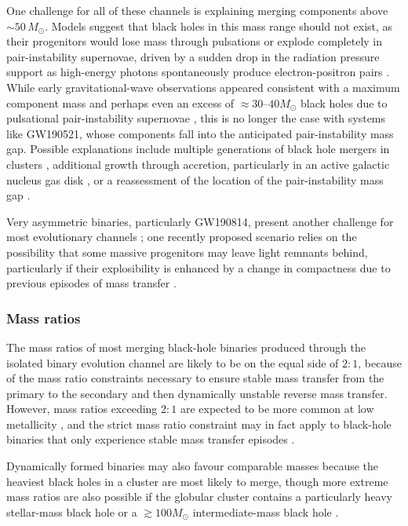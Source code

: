 \documentclass[review]{elsarticle}
\begin{document}
One challenge for all of these channels is explaining merging components above $\sim 50\, M_\odot$.  Models suggest that black holes in this mass range should not exist, as their progenitors would lose mass through pulsations or explode completely in pair-instability supernovae, driven by a sudden drop in the radiation pressure support as high-energy photons spontaneously produce electron-positron pairs  \citep[e.g.,][]{Woosley:2017,Farmer:2019}.  While early gravitational-wave observations appeared consistent with a maximum component mass and perhaps even an excess of $\approx 30$--$40 M_\odot$ black holes due to pulsational pair-instability supernovae \citep[e.g.,][]{Stevenson:2019}, this is no longer the case with systems like GW190521, whose components fall into the anticipated pair-instability mass gap.  Possible explanations \citep{GW190521:astro} include multiple generations of black hole mergers in clusters \citep[e.g.,][]{Rodriguez:2019,Anagnostou:2020}, additional growth through accretion, particularly in an active galactic nucleus gas disk \citep[e.g.,][]{GerosaFishbach:2021,Tagawa:2021}, or a reassessment of the location of the pair-instability mass gap \citep{Belczynski:2020massgap}.

Very asymmetric binaries, particularly GW190814, present another challenge for most evolutionary channels \citep{Zevin:2020,Mandel:2020}; one recently proposed scenario relies on the possibility that some massive progenitors may leave light remnants behind, particularly if their explosibility is enhanced by a change in compactness due to previous episodes of mass transfer \citep{Antoniadis:2021}.  

\subsubsection{Mass ratios}
The mass ratios of most merging black-hole binaries produced through the isolated binary evolution channel are likely to be on the equal side of $2:1$, because of the mass ratio constraints necessary to ensure stable mass transfer from the primary to the secondary and then dynamically unstable reverse mass transfer.   However, mass ratios exceeding $2:1$ are expected to be more common at low metallicity \citep{Dominik:2012,Stevenson:2017}, and the strict mass ratio constraint may in fact apply to black-hole binaries that only experience stable mass transfer episodes \citep{vanSon:2021}.

Dynamically formed binaries may also favour comparable masses because the heaviest black holes in a cluster are most likely to merge, though more extreme mass ratios are also possible if the globular cluster contains a particularly heavy stellar-mass black hole or a $\gtrsim 100 M_\odot$ intermediate-mass black hole \citep{Mandel:2008,Belczynski:2014VMS}. 
\end{document}
